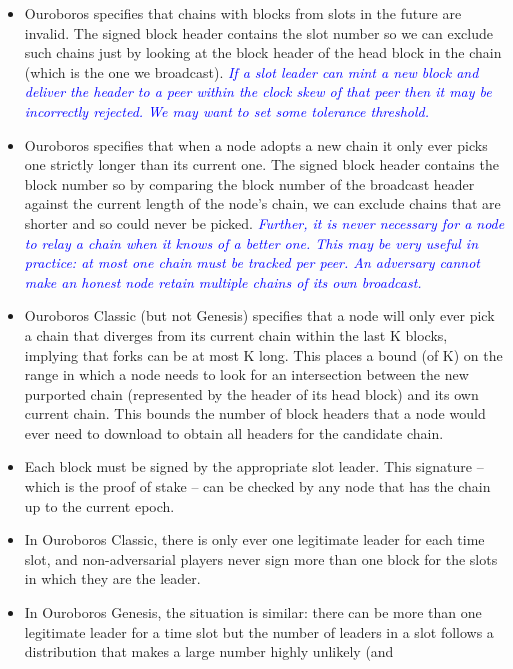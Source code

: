 \documentclass{article}
\newcommand{\avieth}[1]{\textcolor{blue}{\emph{#1}}}
\theoremstyle{definition}{
  \newtheorem{lemma}{Lemma}[section] %
  \newtheorem{definition}[lemma]{Definition}
}
\theoremstyle{theorem}{
  \newtheorem{invariant}[lemma]{Invariant}
  \newtheorem{proofobligation}[lemma]{Proof Obligation}
}
\numberwithin{equation}{lemma}
\begin{document}
\begin{itemize}
\item Ouroboros specifies that chains with blocks from slots in the future are
      invalid. The signed block header contains the slot number so we can
      exclude such chains just by looking at the block header of the head block
      in the chain (which is the one we broadcast).
      \avieth{If a slot leader can mint a new block and deliver the header to
      a peer within the clock skew of that peer then it may be incorrectly
      rejected. We may want to set some tolerance threshold.}
\item Ouroboros specifies that when a node adopts a new chain it only ever
      picks one strictly longer than its current one. The signed block header
      contains the block number so by comparing the block number of the
      broadcast header against the current length of the node's chain, we can
      exclude chains that are shorter and so could never be picked.
      \avieth{Further, it is never necessary for a node to relay a chain when it
      knows of a better one. This may be very useful in practice: at most one
      chain must be tracked per peer. An adversary cannot make an honest node
      retain multiple chains of its own broadcast.}
\item Ouroboros Classic (but not Genesis) specifies that a node will only ever pick
      a chain that diverges from its current chain within the last K blocks,
      implying that forks can be at most K long. This places a bound (of K) on
      the range in which a node needs to look for an intersection between the
      new purported chain (represented by the header of its head block) and its
      own current chain. This bounds the number of block headers that a node
      would ever need to download to obtain all headers for the candidate chain.
\item Each block must be signed by the appropriate slot leader. This signature
      -- which is the proof of stake -- can be checked by any node that has
      the chain up to the current epoch.
\item In Ouroboros Classic, there is only ever one legitimate leader for each
      time slot, and non-adversarial players never sign more than one block
      for the slots in which they are the leader.
\item In Ouroboros Genesis, the situation is similar: there can be more than one
      legitimate leader for a time slot but the number of leaders in a slot
      follows a distribution that makes a large number highly unlikely (and

\end{itemize}
\end{document}
